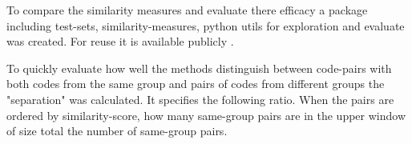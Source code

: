 \documentclass[../main.tex]{subfiles}
\begin{document}
To compare the similarity measures and evaluate there efficacy a package including test-sets,
similarity-measures, python utils for exploration and evaluate was created. For reuse it is available publicly \cite{ethereum-contract-similarity}.

To quickly evaluate how well the methods distinguish between code-pairs with both codes from the same group and pairs of codes from different groups the "separation" was calculated.
It specifies the following ratio.
When the pairs are ordered by similarity-score, how many same-group pairs are in the upper window of size total the number of same-group pairs.
\end{document}
